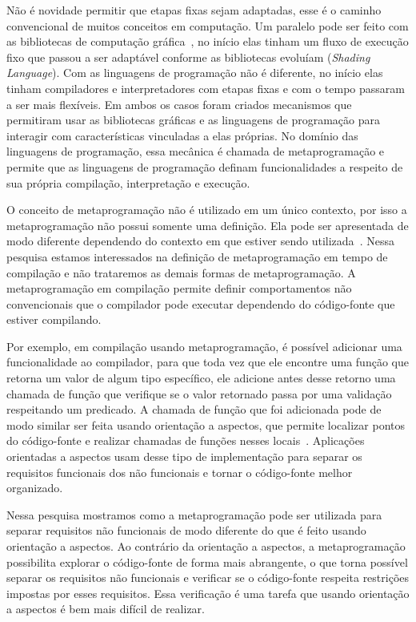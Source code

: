 Não é novidade permitir que etapas fixas sejam adaptadas, esse é o caminho convencional de muitos conceitos em computação. Um paralelo pode ser feito com as bibliotecas de computação gráfica~\cite{rost2009opengl}, no início elas tinham um fluxo de execução fixo que passou a ser adaptável conforme as bibliotecas evoluíam (\emph{Shading Language}). Com as linguagens de programação não é diferente, no início elas tinham compiladores e interpretadores com etapas fixas e com o tempo passaram a ser mais flexíveis. Em ambos os casos foram criados mecanismos que permitiram usar as bibliotecas gráficas e as linguagens de programação para interagir com características vinculadas a elas próprias. No domínio das linguagens de programação, essa mecânica é chamada de metaprogramação e permite que as linguagens de programação definam funcionalidades a respeito de sua própria compilação, interpretação e execução.

O conceito de metaprogramação não é utilizado em um único contexto, por isso a metaprogramação não possui somente uma definição. Ela pode ser apresentada de modo diferente dependendo do contexto em que estiver sendo utilizada~\cite{damavsevivcius2015taxonomy}. Nessa pesquisa estamos interessados na definição de metaprogramação em tempo de compilação e não trataremos as demais formas de metaprogramação. A metaprogramação em compilação permite definir comportamentos não convencionais que o compilador pode executar dependendo do código-fonte que estiver compilando.

Por exemplo, em compilação usando metaprogramação, é possível adicionar uma funcionalidade ao compilador, para que toda vez que ele encontre uma função que retorna um valor de algum tipo específico, ele adicione antes desse retorno uma chamada de função que verifique se o valor retornado passa por uma validação respeitando um predicado. A chamada de função que foi adicionada pode de modo similar ser feita usando orientação a aspectos, que permite localizar pontos do código-fonte e realizar chamadas de funções nesses locais~\cite{kiczales1997aspect}. Aplicações orientadas a aspectos usam desse tipo de implementação para separar os requisitos funcionais dos não funcionais e tornar o código-fonte melhor organizado. 

Nessa pesquisa mostramos como a metaprogramação pode ser utilizada para separar requisitos não funcionais de modo diferente do que é feito usando orientação a aspectos. Ao contrário da orientação a aspectos, a metaprogramação possibilita explorar o código-fonte de forma mais abrangente, o que torna possível separar os requisitos não funcionais e verificar se o código-fonte respeita restrições impostas por esses requisitos. Essa verificação é uma tarefa que usando orientação a aspectos é bem mais difícil de realizar.

